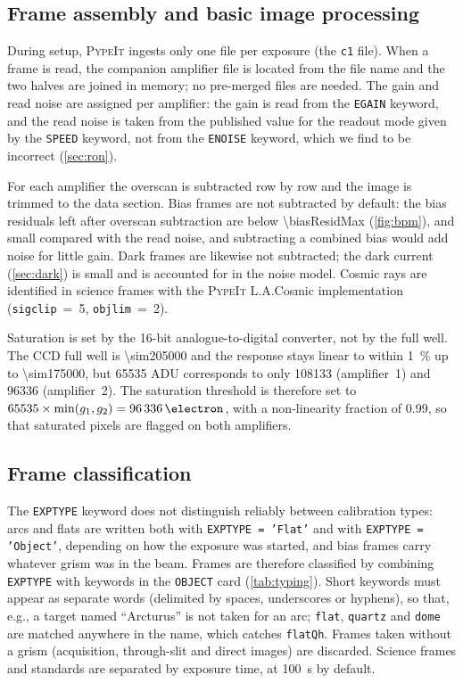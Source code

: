 \documentclass[11pt,a4paper]{article}
\newcommand{\pypeit}{\textsc{PypeIt}}
\newcommand{\code}[1]{\texttt{#1}}
\begin{document}
\subsection{Frame assembly and basic image processing}
\label{sec:basic}

During setup, \pypeit{} ingests only one file per exposure (the \code{c1}
file). When a frame is read, the companion amplifier file is located from the
file name and the two halves are joined in memory; no pre-merged files are
needed. The gain and read noise are assigned per amplifier: the gain is read
from the \code{EGAIN} keyword, and the read noise is taken from the published
value for the readout mode given by the \code{SPEED} keyword, not from the
\code{ENOISE} keyword, which we find to be incorrect (\cref{sec:ron}).

For each amplifier the overscan is subtracted row by row and the image is
trimmed to the data section. Bias frames are not subtracted by default: the
bias residuals left after overscan subtraction are below
\SI{\biasResidMax}{\adu} (\cref{fig:bpm}), and small compared with the read noise,
and subtracting a combined bias would add noise for little gain. Dark frames are likewise not
subtracted; the dark current (\cref{sec:dark}) is small and is accounted for in
the noise model. Cosmic rays are identified in science frames with the
\pypeit{} L.A.Cosmic implementation (\code{sigclip}~=~5,
\code{objlim}~=~2).

Saturation is set by the 16-bit analogue-to-digital converter, not by the full
well. The CCD full well is \SI{\sim205000}{\electron} and the response stays
linear to within \SI{1}{\percent} up to \SI{\sim175000}{\electron}, but 65535
ADU corresponds to only \SI{108133}{\electron} (amplifier~1) and
\SI{96336}{\electron} (amplifier~2). The saturation threshold is therefore set
to $65535\times\min(g_1,g_2) = \SI{\satLevel}{\electron}$, with a
non-linearity fraction of 0.99, so that saturated pixels are flagged on both
amplifiers.

\subsection{Frame classification}
\label{sec:typing}

The \code{EXPTYPE} keyword does not distinguish reliably between calibration
types: arcs and flats are written both with \code{EXPTYPE = 'Flat'} and with
\code{EXPTYPE = 'Object'}, depending on how the exposure was started, and
bias frames carry whatever grism was in the beam. Frames are therefore
classified by combining \code{EXPTYPE} with keywords in the \code{OBJECT}
card (\cref{tab:typing}). Short keywords must appear as separate words
(delimited by spaces, underscores or hyphens), so that, e.g., a target named
``Arcturus'' is not taken for an arc; \code{flat}, \code{quartz} and
\code{dome} are matched anywhere in the name, which catches \code{flatQh}.
Frames taken without a grism (acquisition, through-slit and direct images) are
discarded. Science frames and standards are separated by exposure time, at
\SI{100}{\second} by default.
\end{document}
